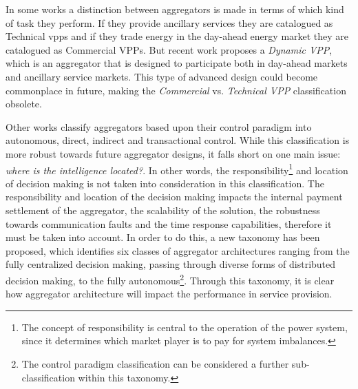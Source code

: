 In some works a distinction between aggregators is made in terms of which kind of task they perform. If they provide ancillary services they are catalogued as Technical \Glspl{vpp} and if they trade energy in the day-ahead energy market they are catalogued as Commercial VPPs. But recent work proposes a \emph{Dynamic VPP}, which is an aggregator that is designed to participate both in day-ahead markets and ancillary service markets. This type of advanced design could become commonplace in future, making the \emph{Commercial} vs. \emph{Technical VPP} classification obsolete.

Other works classify aggregators based upon their control paradigm into autonomous, direct, indirect and transactional control. While this classification is more robust towards future aggregator designs, it falls short on one main issue: \emph{where is the intelligence located?}. In other words, the responsibility\footnote{The concept of responsibility is central to the operation of the power system, since it determines which market player is to pay for system imbalances.} and location of decision making is not taken into consideration in this classification. The responsibility and location of the decision making impacts the internal payment settlement of the aggregator, the scalability of the solution, the robustness towards communication faults and the time response capabilities, therefore it must be taken into account. In order to do this, a new taxonomy has been proposed, which identifies six classes of aggregator architectures ranging from the fully centralized decision making, passing through diverse forms of distributed decision making, to the fully autonomous\footnote{The control paradigm classification can be considered a further sub-classification within this taxonomy.}. Through this taxonomy, it is clear how aggregator architecture will impact the performance in service provision.


